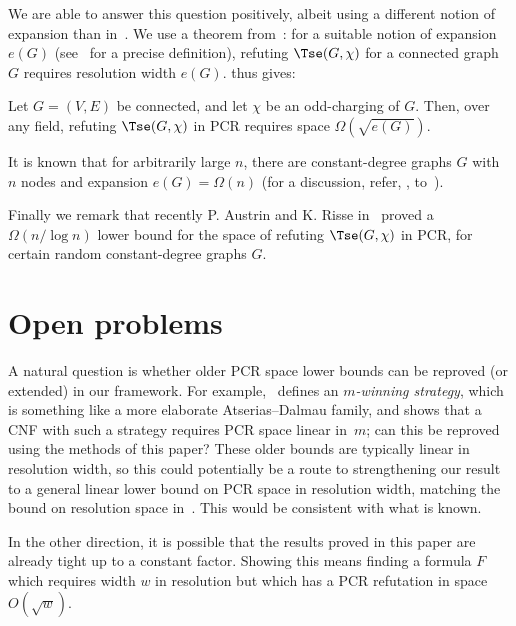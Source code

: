 We are able to answer this question positively, albeit using a different notion of expansion than 
in~\cite{DBLP:conf/icalp/FilmusLMNV13}. 
We use a theorem from~\cite{DBLP:journals/jacm/Ben-SassonW01}:
for a suitable notion of expansion $e(G)$ (see~\cite{DBLP:journals/jacm/Ben-SassonW01} for a precise definition),
refuting $\Tse(G,\chi)$ for a connected graph $G$ requires resolution width $e(G)$.
  thus gives:

\begin{theorem} Let $G = (V, E)$ be connected, and let $\chi$ be an odd-charging of $G$.
Then, over any field, refuting $\Tse(G, \chi)$ in PCR requires space $\Omega(\sqrt{e(G)})$.
\end{theorem}

It is known that for arbitrarily large $n$, there are constant-degree graphs $G$ with $n$ nodes
and expansion \mbox{$e(G) = \Omega(n)$} (for a discussion, refer, \eg,  to~\cite{DBLP:journals/jacm/Urquhart87}).

Finally we remark that recently  P. Austrin and K. Risse  in~\cite{DBLP:conf/soda/AustrinR22} 
 proved a $\Omega(n/\log n)$ lower bound for the space of refuting  $\Tse(G, \chi)$ in PCR, 
 for certain random constant-degree graphs $G$. 


%
\section{Open problems} \label{sec:open}
%

A natural question is whether older PCR space lower bounds
can be reproved (or extended) in our framework.
For example,~\cite{DBLP:journals/jacm/BonacinaG15}
defines an \emph{$m$-winning strategy}, which is something
like a more elaborate Atserias--Dalmau family, and 
shows that a CNF with such a strategy requires PCR space linear in~$m$;
can this be reproved using the methods of this paper? 
These older bounds are typically linear in resolution width, so this
could potentially be a route to strengthening our result to 
a general linear lower bound on PCR space in resolution width,
matching the bound on resolution space in~\cite{DBLP:journals/jcss/AtseriasD08}.
This would be consistent with what is known.

In the other direction, it is possible that the results proved
in this paper are already tight up to a constant factor.
Showing this means finding
 a formula $F$ which requires width $w$ in resolution but which has  a PCR refutation in
space $O(\sqrt{w})$.

